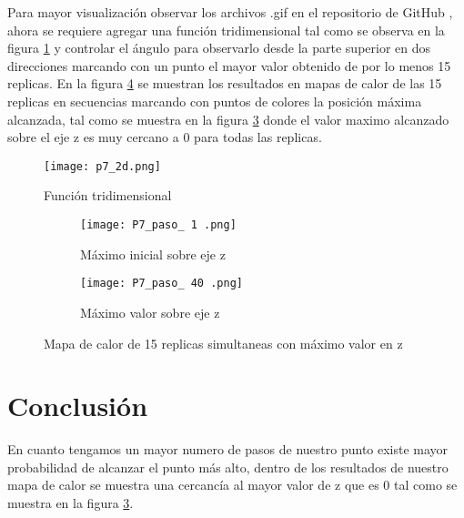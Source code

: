 \documentclass[a4paper]{article}
\begin{document}
\begin{justify}
Para mayor visualización observar los archivos .gif en el repositorio de GitHub \cite{gitadrian}, ahora se requiere agregar una función tridimensional tal como se observa en la figura \ref{fig.3} y controlar el ángulo para observarlo desde la parte superior en dos direcciones marcando con un punto el mayor valor obtenido de por lo menos 15 replicas. En la figura \ref{fig.4} se muestran los resultados en mapas de calor de las 15 replicas en secuencias marcando con puntos de colores la posición máxima alcanzada, tal como se muestra en la figura \ref{4c} donde el valor maximo alcanzado sobre el eje z es muy cercano a $0$ para todas las replicas.
\begin{figure}[h!]
    \centering
\texttt{[image: p7\_2d.png]}
\caption{Función tridimensional}
    \label{fig.3}
\end{figure}

\begin{figure}[h!]
    \centering
\begin{subfigure}[b]{0.45\linewidth}
\texttt{[image: P7\_paso\_ 1 .png]}
\caption{Máximo inicial sobre eje z}
\label{4a}
\end{subfigure}
\begin{subfigure}[b]{0.45\linewidth}
\texttt{[image: P7\_paso\_ 40 .png]}
\caption{Máximo valor sobre eje z}
\label{4c}
\end{subfigure}
\caption{Mapa de calor de 15 replicas simultaneas con máximo valor en z}
    \label{fig.4}
\end{figure}



\section{Conclusión}
En cuanto tengamos un mayor numero de pasos de nuestro punto existe mayor probabilidad de alcanzar el punto más alto, dentro de los resultados de nuestro mapa de calor se muestra una cercancía al mayor valor de z que es $0$ tal como se muestra en la figura \ref{4c}.
\end{justify}
\newpage
\end{document}
